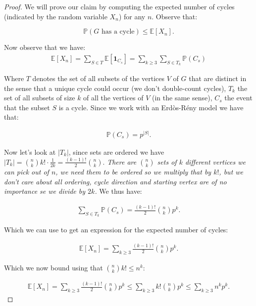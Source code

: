 \documentclass[11pt]{article}
\begin{document}
\begin{proof}
    We will prove our claim by computing the expected number of cycles (indicated by the random variable $X_n$) for any $n$. Observe that:

    \[ \mathbb{P}(\text{$G$ has a cycle}) \leq \mathbb{E}[X_n].\]

    Now observe that we have:
    \begin{align*}
        \mathbb{E}[X_n] = \sum_{S \in T} \mathbb{E}[\bm{1}_{C_s}] = \sum_{k \geq 3} \sum_{S \in T_k}  \mathbb{P}(C_s)
    \end{align*}

    Where $T$ denotes the set of all subsets of the vertices $V$ of $G$ that are distinct in the sense that a unique cycle could occur (we don't double-count cycles), $T_k$ the set of all subsets of size $k$ of all the vertices of $V$ (in the same sense), $C_s$ the event that the subset $S$ is a cycle. Since we work with an Erdòs-Rény model we have that:

    \begin{align*}
        \mathbb{P}(C_s) = p^{|S|}.
    \end{align*}

    Now let's look at $|T_k|$, since sets are ordered we have $|T_k|=\binom{n}{k}k!\cdot\frac{1}{2k} = \frac{(k-1)!}{2}\binom{n}{k}$. \textit{There are $\binom{n}{k}$ sets of $k$ different vertices we can pick out of $n$, we need them to be ordered so we multiply that by $k!$, but we don't care about all ordering, cycle direction and starting vertex are of no importance se we divide by $2k$.} We thus have:
    
    \begin{align*}
        \sum_{S \in T_k} \mathbb{P}(C_s) = \frac{(k-1)!}{2}\binom{n}{k}p^k.
    \end{align*}

    Which we can use to get an expression for the expected number of cycles:

    \begin{align*}
        \mathbb{E}[X_n] =  \sum_{k \geq 3} \frac{(k-1)!}{2}\binom{n}{k}p^k.
    \end{align*}

    Which we now bound using that $\binom{n}{k}k! \leq n^k$:

    \begin{align*}
        \mathbb{E}[X_n] =  \sum_{k \geq 3} \frac{(k-1)!}{2}\binom{n}{k}p^k 
        \leq  \sum_{k \geq 3} k! \binom{n}{k}p^k \leq  \sum_{k \geq 3} n^k p^k.
    \end{align*}


\end{proof}
\end{document}
